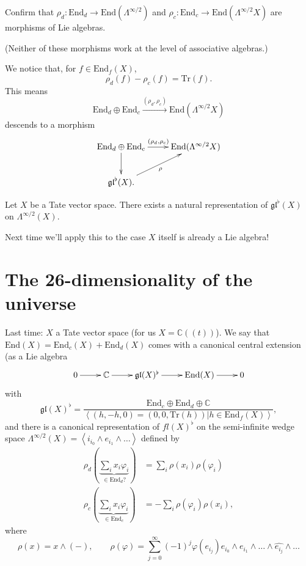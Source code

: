 \begin{exercise}
\label{exercise-representation-of-end}
Confirm that $\rho_d: \text{End}_d \to \text{End}(\Lambda^{\infty/2})$ 
and $\rho_c:\text{End}_c \to \text{End}(\Lambda^{\infty/2}X)$
are morphisms of Lie algebras.
\end{exercise}

\noindent
(Neither of these morphisms work at the
level of associative algebras.)

\medskip\noindent
We notice that,
for $f \in \text{End}_f(X)$,
$$
\rho_d(f)-\rho_c(f)=\text{Tr}(f).
$$
This means 
$$
\text{End}_d \oplus \text{End}_c \xrightarrow{(\rho_d,\rho_c)}
\text{End}(\Lambda^{\infty/2}X)
$$
descends to a morphism
$$
\xymatrix{
\text{End}_d \oplus \text{End}_c\ar[r]^{(\rho_d,\rho_c)}\ar[d]
&\text{End}(\Lambda^{\infty/2}X)\\
\mathfrak{gl}^\flat (X).\ar[ur]_\rho
}
$$

\begin{theorem}
\label{theorem-tate}
Let $X$ be a Tate vector space.
There exists a natural representation
of $\mathfrak{gl}^\flat(X)$ on $\Lambda^{\infty/2}(X)$.
\end{theorem}

\noindent
Next time we'll apply this to the case
$X$ itself is already a Lie algebra!

\section{The 26-dimensionality of the universe}
\label{section-26-dimensionality-universe}

Last time: $X$ a Tate vector space (for us $X=\mathbb{C}((t))$).
We say that $\text{End}(X)=\text{End}_c(X)+\text{End}_d(X)$
comes with a canonical central extension
(as a Lie algebra
$$
\xymatrix{
0\ar[r]&\mathbb{C}\ar[r]&
\mathfrak{gl}(X)^\flat\ar[r]&
\text{End}(X)\ar[r]&0
}
$$
with
$$
\mathfrak{gl}(X)^\flat=
\frac{\text{End}_c \oplus \text{End}_d \oplus \mathbb{C}}{
\left<(h,-h,0)=(0,0,\text{Tr}(h))|h \in \text{End}_f(X)\right>},
$$
and there is a canonical representation of 
$fl(X)^\flat$ on the semi-infinite wedge space
$\Lambda^{\infty/2}(X)=\left<i_{i_0}\wedge e_{i_1}\wedge\ldots\right>$ 
defined by
\begin{equation}
\label{equation-rep}
\begin{aligned}
\rho_d(\underbrace{\sum_ix_i\varphi_i}_{\in\text{End}_d?})&=
\sum_i\rho(x_i)\rho(\varphi_i)\\
\rho_c(\underbrace{\sum_ix_i\varphi_i}_{\in \text{End}_c})&=
-\sum_i\rho(\varphi_i)\rho(x_i),
\end{aligned}
\end{equation}
where
$$
\rho(x)=x\wedge(-),\qquad 
\rho(\varphi)=
\sum_{j=0}^\infty(-1)^j \varphi(e_{i_j})
e_{i_0}\wedge e_{i_1}\wedge \ldots \wedge \widehat{e_{i_j}}\wedge\ldots
$$


